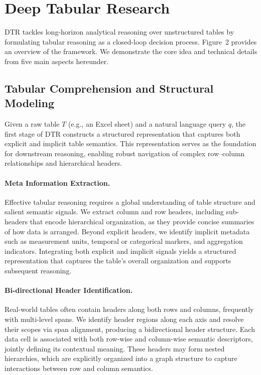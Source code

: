 \vspace{-2mm}
\section{Deep Tabular Research}\label{sec:method}
DTR tackles long-horizon analytical reasoning over unstructured tables by formulating tabular reasoning as a closed-loop decision process. Figure~2 provides an overview of the framework. We demonstrate the core idea and technical details from five main aspects hereunder.
\vspace{-2mm}
\subsection{Tabular Comprehension and Structural Modeling}

Given a raw table $T$ (e.g., an Excel sheet) and a natural language query $q$, the first stage of DTR constructs a structured representation that captures both explicit and implicit table semantics. This representation serves as the foundation for downstream reasoning, enabling robust navigation of complex row--column relationships and hierarchical headers.
\vspace{-3mm}
\paragraph{Meta Information Extraction.}
Effective tabular reasoning requires a global understanding of table structure and salient semantic signals. We extract column and row headers, including sub-headers that encode hierarchical organization, as they provide concise summaries of how data is arranged. Beyond explicit headers, we identify implicit metadata such as measurement units, temporal or categorical markers, and aggregation indicators. Integrating both explicit and implicit signals yields a structured representation that captures the table’s overall organization and supports subsequent reasoning.
\vspace{-3mm}
\paragraph{Bi-directional Header Identification.}
Real-world tables often contain headers along both rows and columns, frequently with multi-level spans. We identify header regions along each axis and resolve their scopes via span alignment, producing a bidirectional header structure. Each data cell is associated with both row-wise and column-wise semantic descriptors, jointly defining its contextual meaning. These headers may form nested hierarchies, which are explicitly organized into a graph structure to capture interactions between row and column semantics.
\vspace{-5mm}
